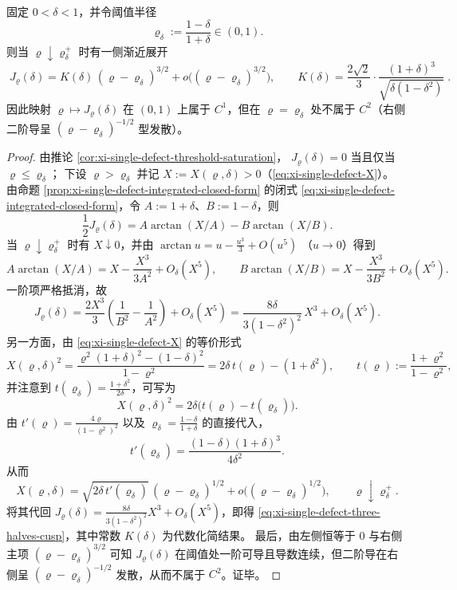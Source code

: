 \begin{proposition}\label{prop:xi-single-defect-threshold-phase-transition}
固定 \(0<\delta<1\)，并令阈值半径
\[
\varrho_\delta:=\frac{1-\delta}{1+\delta}\in(0,1).
\]
则当 \(\varrho\downarrow \varrho_\delta^+\) 时有一侧渐近展开
\begin{equation}\label{eq:xi-single-defect-three-halves-cusp}
\boxed{\;
J_{\varrho}(\delta)
=K(\delta)\,(\varrho-\varrho_\delta)^{3/2}
+o\!\big((\varrho-\varrho_\delta)^{3/2}\big),\qquad
K(\delta)=\frac{2\sqrt2}{3}\cdot\frac{(1+\delta)^3}{\sqrt{\delta(1-\delta^2)}}\; }.
\end{equation}
因此映射 \(\varrho\mapsto J_{\varrho}(\delta)\) 在 \((0,1)\) 上属于 \(C^1\)，但在 \(\varrho=\varrho_\delta\) 处不属于 \(C^2\)（右侧二阶导呈 \((\varrho-\varrho_\delta)^{-1/2}\) 型发散）。
\end{proposition}
\begin{proof}
由推论 \ref{cor:xi-single-defect-threshold-saturation}，
\(
J_{\varrho}(\delta)=0
\)
当且仅当 \(\varrho\le \varrho_\delta\)；
下设 \(\varrho>\varrho_\delta\) 并记 \(X:=X(\varrho,\delta)>0\)（\eqref{eq:xi-single-defect-X}）。
由命题 \ref{prop:xi-single-defect-integrated-closed-form} 的闭式 \eqref{eq:xi-single-defect-integrated-closed-form}，令 \(A:=1+\delta\)、\(B:=1-\delta\)，则
\[
\frac12 J_{\varrho}(\delta)=A\arctan(X/A)-B\arctan(X/B).
\]
当 \(\varrho\downarrow \varrho_\delta^+\) 时有 \(X\downarrow 0\)，并由
\(
\arctan u=u-\frac{u^3}{3}+O(u^5)
\)
（\(u\to 0\)）得到
\[
A\arctan(X/A)=X-\frac{X^3}{3A^2}+O_\delta(X^5),
\qquad
B\arctan(X/B)=X-\frac{X^3}{3B^2}+O_\delta(X^5).
\]
一阶项严格抵消，故
\[
J_{\varrho}(\delta)
=\frac{2X^3}{3}\left(\frac{1}{B^2}-\frac{1}{A^2}\right)+O_\delta(X^5)
=\frac{8\delta}{3(1-\delta^2)^2}\,X^3+O_\delta(X^5).
\]
另一方面，由 \eqref{eq:xi-single-defect-X} 的等价形式
\[
X(\varrho,\delta)^2
=\frac{\varrho^2(1+\delta)^2-(1-\delta)^2}{1-\varrho^2}
=2\delta\,t(\varrho)-(1+\delta^2),
\qquad
t(\varrho):=\frac{1+\varrho^2}{1-\varrho^2},
\]
并注意到 \(t(\varrho_\delta)=\frac{1+\delta^2}{2\delta}\)，可写为
\[
X(\varrho,\delta)^2=2\delta\bigl(t(\varrho)-t(\varrho_\delta)\bigr).
\]
由 \(t'(\varrho)=\frac{4\varrho}{(1-\varrho^2)^2}\) 以及 \(\varrho_\delta=\frac{1-\delta}{1+\delta}\) 的直接代入，
\[
t'(\varrho_\delta)=\frac{(1-\delta)(1+\delta)^3}{4\delta^2}.
\]
从而
\[
X(\varrho,\delta)
=\sqrt{2\delta\,t'(\varrho_\delta)}\,(\varrho-\varrho_\delta)^{1/2}
+o\!\big((\varrho-\varrho_\delta)^{1/2}\big),
\qquad \varrho\downarrow \varrho_\delta^+.
\]
将其代回 \(J_{\varrho}(\delta)=\frac{8\delta}{3(1-\delta^2)^2}X^3+O_\delta(X^5)\)，即得 \eqref{eq:xi-single-defect-three-halves-cusp}，其中常数 \(K(\delta)\) 为代数化简结果。
最后，由左侧恒等于 \(0\) 与右侧主项 \((\varrho-\varrho_\delta)^{3/2}\) 可知 \(J_{\varrho}(\delta)\) 在阈值处一阶可导且导数连续，但二阶导在右侧呈 \((\varrho-\varrho_\delta)^{-1/2}\) 发散，从而不属于 \(C^2\)。证毕。
\end{proof}

\endinput
